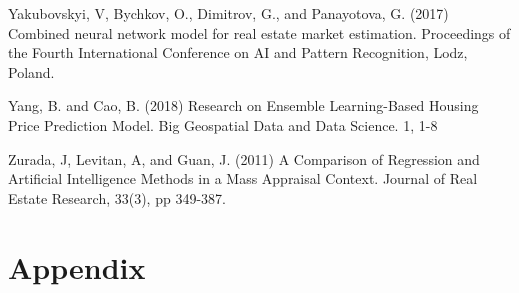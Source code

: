 \documentclass[colTwo]{anon}
\theoremstyle{definition}
\begin{document}
\begin{thebibliography}{50}
\harvarditem{}{}{}Yakubovskyi, V, Bychkov, O., Dimitrov, G., and Panayotova, G.  (2017) Combined neural network model for real estate market estimation. Proceedings of the Fourth International Conference on AI and Pattern Recognition, Lodz, Poland.  

\harvarditem{}{}{}Yang, B. and Cao, B. (2018) Research on Ensemble Learning-Based Housing Price Prediction Model. Big Geospatial Data and Data Science. 1, 1-8

\harvarditem{}{}{}Zurada, J, Levitan, A, and Guan, J. (2011) A Comparison of Regression and Artificial Intelligence Methods in a Mass Appraisal Context. Journal of Real Estate Research, 33(3), pp 349-387. 

\end{thebibliography}

\pagebreak

\section{Appendix}
\end{document}

